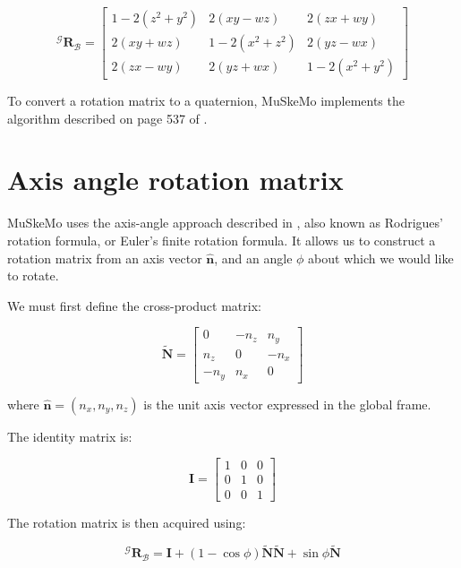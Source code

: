 \documentclass{article}
\begin{document}
\begin{equation}
{}^{\mathcal{G}} \mathbf{R}_{\mathcal{B}} =
\begin{bmatrix}
1 - 2(z^2 + y^2) & 2(xy - wz) & 2(zx + wy) \\
2(xy + wz) & 1 - 2(x^2 + z^2) & 2(yz - wx) \\
2(zx - wy) & 2(yz + wx) & 1 - 2(x^2 + y^2)
\end{bmatrix}
\end{equation}

To convert a rotation matrix to a quaternion, MuSkeMo implements the algorithm described on page 537 of \cite{eberlyGamePhysics2004}.

\section{Axis angle rotation matrix}
\label{sec:axisanglerotation}
 MuSkeMo uses the axis-angle approach described in \cite{valleryAdvancedDynamics2019}, also known as Rodrigues' rotation formula, or Euler's finite rotation formula. It allows us to construct a rotation matrix from an axis vector \( \hat{\mathbf{n}} \), and an angle \( \phi \) about which we would like to rotate.

We must first define the cross-product matrix:

\begin{equation}
\tilde{\mathbf{N}} = 
\begin{bmatrix}
0 & -n_{z} & n_{y} \\
n_{z} & 0 & -n_{x} \\
-n_{y} & n_{x} & 0
\end{bmatrix}
\end{equation}

where \( \hat{\mathbf{n}} = (n_x, n_y, n_z) \) is the unit axis vector expressed in the global frame.

The identity matrix is:

\begin{equation}
\mathbf{I} = 
\begin{bmatrix}
1 & 0 & 0 \\
0 & 1 & 0 \\
0 & 0 & 1
\end{bmatrix}
\end{equation}

The rotation matrix is then acquired using:

\begin{equation}
{}^{\mathcal{G}} \mathbf{R}_{\mathcal{B}} = \mathbf{I} + (1 - \cos\phi) \tilde{\mathbf{N}} \tilde{\mathbf{N}} + \sin\phi \tilde{\mathbf{N}}
\end{equation}
\end{document}
